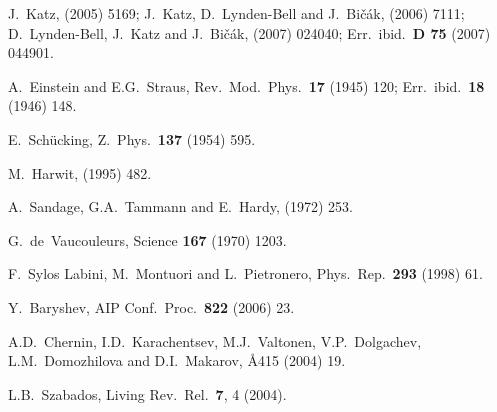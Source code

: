 \documentclass[12pt]{iopart}
\begin{document}
\begin{thebibliography}{66}
J.~Katz,
 (2005) 5169; %
J.~Katz, D.~Lynden-Bell and J.~Bi\v{c}\'ak,
 (2006) 7111; %
D.~Lynden-Bell, J.~Katz and J.~Bi\v{c}\'ak,
 (2007) 024040;
Err.\ ibid.\ {\bf D 75} (2007) 044901. %

A.~Einstein and E.G.~Straus,
Rev.\ Mod.\ Phys.\ {\bf17} (1945) 120; Err.\ ibid.\ {\bf18} (1946) 148.

E.~Sch\"ucking,
Z.\ Phys.\ {\bf137} (1954) 595.

M.~Harwit,
 (1995) 482.

A.~Sandage, G.A.~Tammann and E.~Hardy,
 (1972) 253.

G.~de~Vaucouleurs,
Science {\bf167} (1970) 1203.

F.~Sylos Labini, M.~Montuori and L.~Pietronero,
Phys.\ Rep.\ {\bf 293} (1998) 61. %

Y.~Baryshev,
AIP Conf.\ Proc.\ {\bf 822} (2006) 23. %

A.D.~Chernin, I.D.~Karachentsev, M.J.~Valtonen, V.P.~Dolgachev,
L.M.~Domozhilova and D.I.~Makarov,
\AA{415} (2004) 19. %

L.B.~Szabados,
Living Rev.\ Rel.\ {\bf 7}, 4 (2004).


\end{thebibliography}
\end{document}
